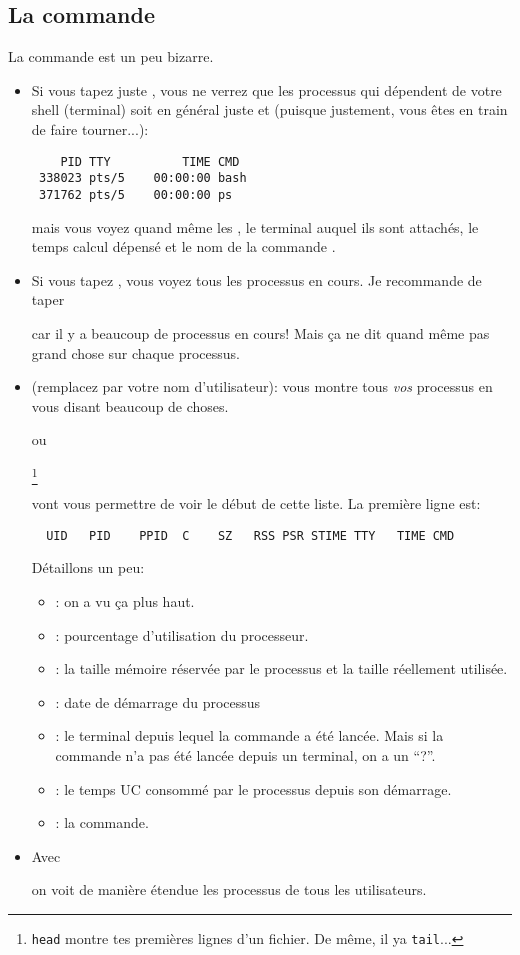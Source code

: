 \subsection{La commande }
La commande  est un peu bizarre.
\begin{itemize}
\item Si vous tapez juste , vous ne verrez que les processus
  qui dépendent de votre shell (terminal) soit en général juste
   et  (puisque justement, vous êtes en train de
  faire tourner...):
\begin{verbatim}
    PID TTY          TIME CMD
 338023 pts/5    00:00:00 bash
 371762 pts/5    00:00:00 ps
\end{verbatim}
mais vous voyez quand même les , le terminal  auquel
ils sont attachés, le temps calcul dépensé  et le nom de la
commande .
\item Si vous tapez , vous voyez tous les processus en
  cours. Je recommande de taper


  car il y a beaucoup
  de processus en cours! Mais ça ne dit quand même pas grand chose
  sur chaque processus.
\item {} (remplacez  par votre nom
  d'utilisateur): vous montre tous \emph{vos} processus en vous disant
  beaucoup de choses.


  ou

  \footnote{\texttt{head} montre tes premières
    lignes d'un fichier. De même, il ya \texttt{tail}...}
  
  vont vous permettre de voir le début de cette liste. La
  première ligne est:
\begin{verbatim}
  UID   PID    PPID  C    SZ   RSS PSR STIME TTY   TIME CMD
\end{verbatim}
Détaillons un peu:
\begin{itemize}
\item  {}: on a vu ça plus haut.
\item  {}: pourcentage d'utilisation du processeur. 
\item  {}: la taille mémoire réservée par le processus et la
  taille réellement utilisée.
\item   {}: date de démarrage du processus
\item   {}: le terminal depuis lequel la commande a été
  lancée. Mais si la commande n'a pas été lancée depuis un terminal,
  on a un ``?''.
\item {}: le temps UC consommé par le processus depuis son démarrage.
\item {}: la commande.
\end{itemize}
\item Avec


  on voit de manière étendue les
  processus de tous les utilisateurs.
\end{itemize}

